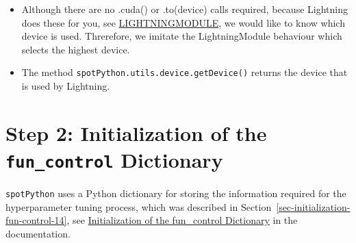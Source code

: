\documentclass[
  letterpaper,
  DIV=11,
  numbers=noendperiod]{scrreprt}
\providecommand{\tightlist}{%
  \setlength{\itemsep}{0pt}\setlength{\parskip}{0pt}}\usepackage{longtable,booktabs,array}
\begin{document}
\begin{tcolorbox}[enhanced jigsaw, left=2mm, title=\textcolor{quarto-callout-note-color}{\faInfo}\hspace{0.5em}{Note: Device selection}, titlerule=0mm, toprule=.15mm, leftrule=.75mm, colbacktitle=quarto-callout-note-color!10!white, colback=white, arc=.35mm, toptitle=1mm, bottomtitle=1mm, colframe=quarto-callout-note-color-frame, bottomrule=.15mm, rightrule=.15mm, breakable, coltitle=black, opacitybacktitle=0.6, opacityback=0]

\begin{itemize}
\tightlist
\item
  Although there are no .cuda() or .to(device) calls required, because
  Lightning does these for you, see
  \href{https://lightning.ai/docs/pytorch/stable/common/lightning_module.html}{LIGHTNINGMODULE},
  we would like to know which device is used. Threrefore, we imitate the
  LightningModule behaviour which selects the highest device.
\item
  The method \texttt{spotPython.utils.device.getDevice()} returns the
  device that is used by Lightning.
\end{itemize}

\end{tcolorbox}

\hypertarget{step-2-initialization-of-the-fun_control-dictionary}{%
\section{\texorpdfstring{Step 2: Initialization of the
\texttt{fun\_control}
Dictionary}{Step 2: Initialization of the fun\_control Dictionary}}\label{step-2-initialization-of-the-fun_control-dictionary}}

\texttt{spotPython} uses a Python dictionary for storing the information
required for the hyperparameter tuning process, which was described in
Section~\ref{sec-initialization-fun-control-14}, see
\href{https://sequential-parameter-optimization.github.io/spotPython/14_spot_ray_hpt_torch_cifar10.html\#sec-initialization-fun-control-14}{Initialization
of the fun\_control Dictionary} in the documentation.
\end{document}
